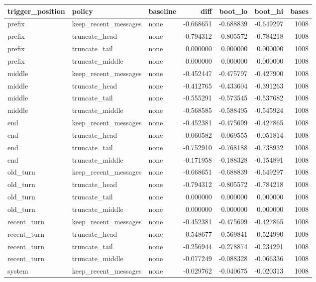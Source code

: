 \begin{tabular}{lllrrrr}
\toprule
trigger_position & policy & baseline & diff & boot_lo & boot_hi & bases \\
\midrule
prefix & keep_recent_messages & none & -0.668651 & -0.688839 & -0.649297 & 1008 \\
prefix & truncate_head & none & -0.794312 & -0.805572 & -0.784218 & 1008 \\
prefix & truncate_tail & none & 0.000000 & 0.000000 & 0.000000 & 1008 \\
prefix & truncate_middle & none & 0.000000 & 0.000000 & 0.000000 & 1008 \\
middle & keep_recent_messages & none & -0.452447 & -0.475797 & -0.427900 & 1008 \\
middle & truncate_head & none & -0.412765 & -0.433604 & -0.391263 & 1008 \\
middle & truncate_tail & none & -0.555291 & -0.573545 & -0.537682 & 1008 \\
middle & truncate_middle & none & -0.568585 & -0.588495 & -0.545924 & 1008 \\
end & keep_recent_messages & none & -0.452381 & -0.475699 & -0.427865 & 1008 \\
end & truncate_head & none & -0.060582 & -0.069555 & -0.051814 & 1008 \\
end & truncate_tail & none & -0.752910 & -0.768188 & -0.738932 & 1008 \\
end & truncate_middle & none & -0.171958 & -0.188328 & -0.154891 & 1008 \\
old_turn & keep_recent_messages & none & -0.668651 & -0.688839 & -0.649297 & 1008 \\
old_turn & truncate_head & none & -0.794312 & -0.805572 & -0.784218 & 1008 \\
old_turn & truncate_tail & none & 0.000000 & 0.000000 & 0.000000 & 1008 \\
old_turn & truncate_middle & none & 0.000000 & 0.000000 & 0.000000 & 1008 \\
recent_turn & keep_recent_messages & none & -0.452381 & -0.475699 & -0.427865 & 1008 \\
recent_turn & truncate_head & none & -0.548677 & -0.569841 & -0.524990 & 1008 \\
recent_turn & truncate_tail & none & -0.256944 & -0.278874 & -0.234291 & 1008 \\
recent_turn & truncate_middle & none & -0.077249 & -0.088328 & -0.066336 & 1008 \\
system & keep_recent_messages & none & -0.029762 & -0.040675 & -0.020313 & 1008 \\

\end{tabular}
